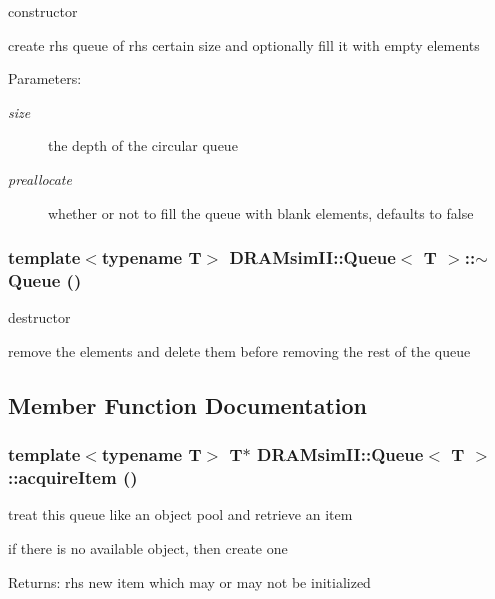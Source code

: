 constructor 

create rhs queue of rhs certain size and optionally fill it with empty elements \begin{Desc}
\item[Parameters:]
\begin{description}
\item[{\em size}]the depth of the circular queue \item[{\em preallocate}]whether or not to fill the queue with blank elements, defaults to false \end{description}
\end{Desc}
\subsubsection[{$\sim$Queue}]{\setlength{\rightskip}{0pt plus 5cm}template$<$typename T$>$ {\bf DRAMsimII::Queue}$<$ T $>$::$\sim${\bf Queue} ()\hspace{0.3cm}{\tt  [inline]}}\label{class_d_r_a_msim_i_i_1_1_queue_3b3f6d860c9b966677b4e1a195e777bf}


destructor 

remove the elements and delete them before removing the rest of the queue 

\subsection{Member Function Documentation}
\subsubsection[{acquireItem}]{\setlength{\rightskip}{0pt plus 5cm}template$<$typename T$>$ T$\ast$ {\bf DRAMsimII::Queue}$<$ T $>$::acquireItem ()\hspace{0.3cm}{\tt  [inline]}}\label{class_d_r_a_msim_i_i_1_1_queue_b54786763992c459ad787749a01ba545}


treat this queue like an object pool and retrieve an item 

if there is no available object, then create one \begin{Desc}
\item[Returns:]rhs new item which may or may not be initialized \end{Desc}
